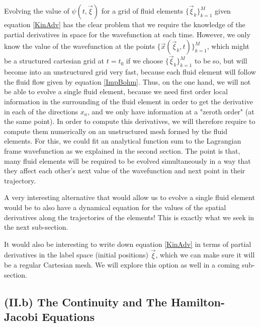 \documentclass[11pt, a4paper]{article} %
\begin{document}
Evolving the value of $\psi(t,\vec{\xi})$ for a grid of fluid elements $\{\vec{\xi}_k\}_{k=1}^M$ given equation \eqref{KinAdv} has the clear problem that we require the knowledge of the partial derivatives in space for the wavefunction at each time. However, we only know the value of the wavefunction at the points $\{\vec{x}(\vec{\xi}_k,t)\}_{k=1}^M$, which might be a structured cartesian grid at $t=t_0$ if we choose $\{\vec{\xi}_k\}_{k=1}^M$ to be so, but will become into an unstructured grid very fast, because each fluid element will follow the fluid flow given by equation \eqref{ImpBohm}. Thus, on the one hand, we will not be able to evolve a single fluid element, because we need first order local information in the surrounding of the fluid element in order to get the derivative in each of the directions $x_a$, and we only have information at a "zeroth order" (at the same point). In order to compute this derivatives, we will therefore require to compute them numerically on an unstructured mesh formed by the fluid elements. For this, we could fit an analytical function sum to the Lagrangian frame wavefunction as we explained in the second section. The point is that, many fluid elements will be required to be evolved simultaneously in a way that they affect each other's next value of the wavefunction and next point in their trajectory.

A very interesting alternative that would allow us to evolve a single fluid element would be to also have a dynamical equation for the values of the spatial derivatives along the trajectories of the elements! This is exactly what we seek in the next sub-section.

It would also be interesting to write down equation \eqref{KinAdv} in terms of partial derivatives in the label space (initial positions) $\vec{\xi}$, which we can make sure it will be a regular Cartesian mesh. We will explore this option as well in a coming sub-section. 








\subsection*{(II.b) The Continuity and The Hamilton-Jacobi Equations}
\end{document}
